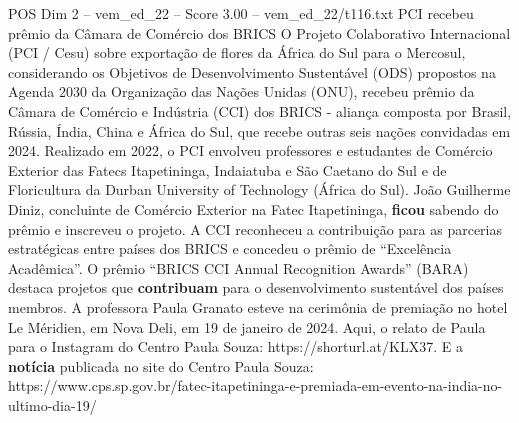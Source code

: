 \begin{textsample}{POS Dim 2 – vem\_ed\_22 – Score 3.00 – vem\_ed\_22/t116.txt}  \label{ex:f2_pos_181}
PCI recebeu prêmio da Câmara de Comércio dos BRICS O Projeto Colaborativo Internacional (PCI / Cesu) sobre exportação de flores da África do Sul para o Mercosul, considerando os Objetivos de Desenvolvimento Sustentável (ODS) propostos na Agenda 2030 da Organização das Nações Unidas (ONU), recebeu prêmio da Câmara de Comércio e Indústria (CCI) dos BRICS - aliança composta por Brasil, Rússia, Índia, China e África do Sul, que recebe outras seis nações convidadas em 2024.
Realizado em 2022, o PCI envolveu professores e estudantes de Comércio Exterior das Fatecs Itapetininga, Indaiatuba e São Caetano do Sul e de Floricultura da Durban University of Technology (África do Sul).
João Guilherme Diniz, concluinte de Comércio Exterior na Fatec Itapetininga, \textbf{ficou} sabendo do prêmio e inscreveu o projeto.
A CCI reconheceu a contribuição para as parcerias estratégicas entre países dos BRICS e concedeu o prêmio de “Excelência Acadêmica”.
O prêmio “BRICS CCI Annual Recognition Awards” (BARA) destaca projetos que \textbf{contribuam} para o desenvolvimento sustentável dos países membros.
A professora Paula Granato esteve na cerimônia de premiação no hotel Le Méridien, em Nova Deli, em 19 de janeiro de 2024.
Aqui, o relato de Paula para o Instagram do Centro Paula Souza: https://shorturl.at/KLX37.
E a \textbf{notícia} publicada no site do Centro Paula Souza: https://www.cps.sp.gov.br/fatec-itapetininga-e-premiada-em-evento-na-india-no-ultimo-dia-19/

\end{textsample}
